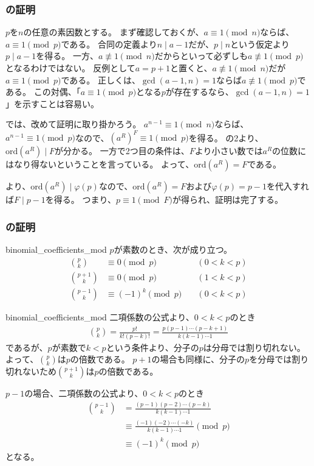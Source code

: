 \subsubsection{の証明}
$p$を$n$の任意の素因数とする。
まず確認しておくが、$a\equiv1\pmod{n}$ならば、$a\equiv1\pmod{p}$である。
合同の定義より$n \mid a-1$だが、$p \mid n$という仮定より$p \mid a-1$を得る。
一方、$a\not\equiv1\pmod{n}$だからといって必ずしも$a\not\equiv1\pmod{p}$となるわけではない。
反例として$a=p+1$と置くと、$a\not\equiv1\pmod{n}$だが$a\equiv1\pmod{p}$である。
正しくは、$\gcd(a-1,n)=1$ならば$a\not\equiv1\pmod{p}$である。
この対偶、「$a\equiv1\pmod{p}$となる$p$が存在するなら、$\gcd(a-1,n)=1$」を示すことは容易い。

では、改めて証明に取り掛かろう。
$a^{n-1}\equiv1\pmod{n}$ならば、$a^{n-1}\equiv1\pmod{p}$なので、$(a^R)^F\equiv1\pmod{p}$を得る。
の2より、$\mbox{ord}(a^R) \mid F$が分かる。
一方で2つ目の条件は、$F$より小さい数では$a^R$の位数にはなり得ないということを言っている。
よって、$\mbox{ord}(a^R) = F$である。

より、$\mbox{ord}(a^R) \mid \varphi(p)$なので、$\mbox{ord}(a^R) = F$および$\varphi(p)=p-1$を代入すれば$F \mid p-1$を得る。
つまり、$p\equiv1\pmod{F}$が得られ、証明は完了する。

\subsubsection{の証明}
\begin{Lemm}{}{binomial_coefficients_mod}
$p$が素数のとき、次が成り立つ。
\begin{align}
{p \choose k} &\equiv 0 \pmod{p} \quad &(0 < k < p)\\
\label{eq:binomial_coefficients_mod_p1}
{p+1 \choose k} &\equiv 0 \pmod{p} \quad &(1 < k < p)\\
\label{eq:binomial_coefficients_mod_m1}
{p-1 \choose k} &\equiv (-1)^k \pmod{p} \quad &(0 < k < p)
\end{align}
\end{Lemm}

\begin{lmProof}{binomial_coefficients_mod}
二項係数の公式より、$0<k<p$のとき
\begin{align*}
{p \choose k} = \frac{p!}{k!(p-k)!} = \frac{p(p-1)\cdots(p-k+1)}{k(k-1)\cdots 1}
\end{align*}
であるが、$p$が素数で$k<p$という条件より、分子の$p$は分母では割り切れない。
よって、${p \choose k}$は$p$の倍数である。
$p+1$の場合も同様に、分子の$p$を分母では割り切れないため${p+1 \choose k}$は$p$の倍数である。

$p-1$の場合、二項係数の公式より、$0<k<p$のとき
\begin{align*}
{p-1 \choose k} &= \frac{(p-1)(p-2)\cdots(p-k)}{k(k-1)\cdots 1}\\
 &\equiv \frac{(-1)(-2)\cdots(-k)}{k(k-1)\cdots 1} \pmod{p}\\
 &\equiv (-1)^k \pmod{p}
\end{align*}
となる。
\end{lmProof}

